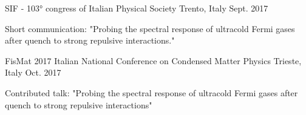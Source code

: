 \begin{cventries}
    
    \cventry
    {}
    {SIF - 103° congress of Italian Physical Society}
    {Trento, Italy}
    {Sept. 2017}
    {
      \begin{cvitems}
        \item {Short communication: "Probing the spectral response of ultracold Fermi gases after quench to strong repulsive interactions."}
      \end{cvitems}
    }
    
    \cventry
    {FisMat 2017}
    {Italian National Conference on Condensed Matter Physics}
    {Trieste, Italy}
    {Oct. 2017}
    {
      \begin{cvitems}
        \item {Contributed talk: "Probing the spectral response of ultracold Fermi gases after quench to strong repulsive interactions"}
      \end{cvitems}
    }

\end{cventries}















